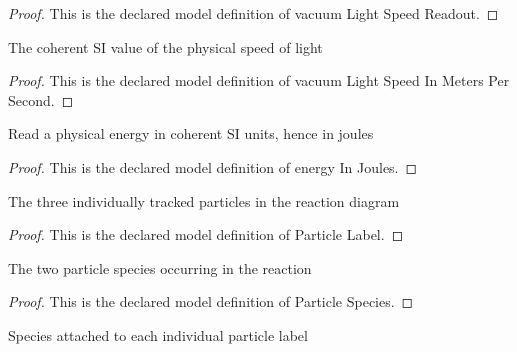 \begin{proof}
  This is the declared model definition of vacuum Light Speed Readout.
\end{proof}
\begin{definition}
  \label{def:physics:phyx-mini-0511:phyxminiproblems-problemphyxmini0511-vacuumlightspeedinmeterspersecond}
  The coherent SI value of the physical speed of light
\end{definition}
\begin{proof}
  This is the declared model definition of vacuum Light Speed In Meters Per Second.
\end{proof}
\begin{definition}
  \label{def:physics:phyx-mini-0511:phyxminiproblems-problemphyxmini0511-energyinjoules}
  Read a physical energy in coherent SI units, hence in joules
\end{definition}
\begin{proof}
  This is the declared model definition of energy In Joules.
\end{proof}
\begin{definition}
  \label{def:physics:phyx-mini-0511:phyxminiproblems-problemphyxmini0511-particlelabel}
  The three individually tracked particles in the reaction diagram
\end{definition}
\begin{proof}
  This is the declared model definition of Particle Label.
\end{proof}
\begin{definition}
  \label{def:physics:phyx-mini-0511:phyxminiproblems-problemphyxmini0511-particlespecies}
  The two particle species occurring in the reaction
\end{definition}
\begin{proof}
  This is the declared model definition of Particle Species.
\end{proof}
\begin{definition}
  \label{def:physics:phyx-mini-0511:phyxminiproblems-problemphyxmini0511-particlespecies-value}
  Species attached to each individual particle label
\end{definition}
